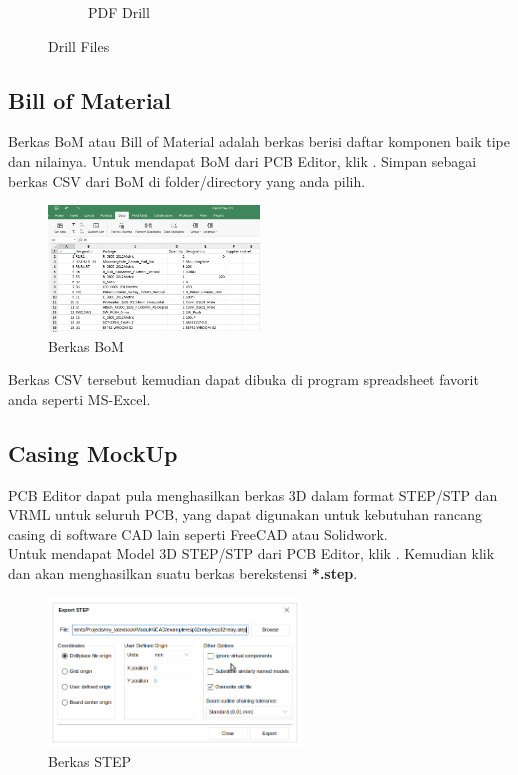 \documentclass[12pt]{book}
\begin{document}
\begin{figure}[!ht]
\begin{subfigure}[t]{0.4\textwidth}
			\caption{PDF Drill}
		\end{subfigure}
		\caption{Drill Files}
	\end{figure}

	\subsection{Bill of Material}

	Berkas BoM atau Bill of Material adalah berkas berisi daftar komponen baik tipe dan nilainya.
	Untuk mendapat BoM dari PCB Editor, klik .
	Simpan sebagai berkas CSV dari BoM di folder/directory yang anda pilih.

	\begin{figure}[!ht]
		\centering
		\includegraphics[width=0.5\textwidth]{images/fab/fab_10}
		\caption{Berkas BoM}
	\end{figure}

	Berkas CSV tersebut kemudian dapat dibuka di program spreadsheet favorit anda seperti MS-Excel.

	\newpage
	\subsection{Casing MockUp}

	PCB Editor dapat pula menghasilkan berkas 3D dalam format STEP/STP dan VRML untuk seluruh PCB,
	yang dapat digunakan untuk kebutuhan rancang casing di software CAD lain seperti FreeCAD atau Solidwork.\\

	Untuk mendapat Model 3D STEP/STP dari PCB Editor, klik .
	Kemudian klik  dan akan menghasilkan suatu berkas berekstensi \textbf{*.step}.

	\begin{figure}[!ht]
		\centering
		\includegraphics[width=0.6\textwidth]{images/fab/fab_11}
		\caption{Berkas STEP}
	\end{figure}
\end{document}
